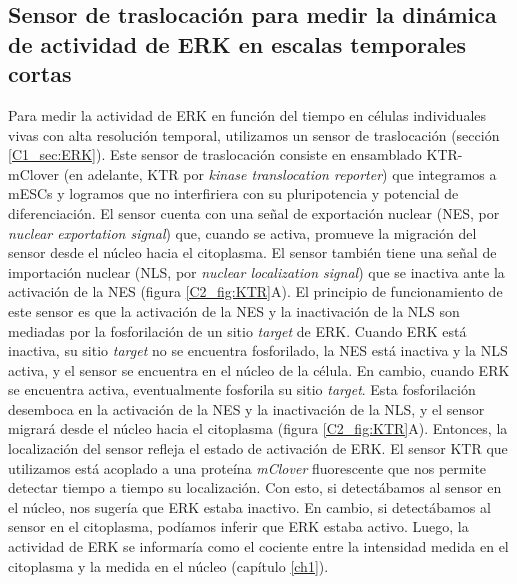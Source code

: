 \documentclass[./main.tex]{subfiles}
\begin{document}
\subsection{Sensor de traslocación para medir la dinámica de actividad de ERK en escalas temporales cortas}
\label{C2_ssec:sensor}

Para medir la actividad de ERK en función del tiempo en células individuales vivas con alta resolución temporal, utilizamos un sensor de traslocación (sección \ref{C1_sec:ERK}).  Este sensor de traslocación consiste en ensamblado KTR-mClover (en adelante, KTR por \textit{kinase translocation reporter}) que integramos a mESCs y logramos que no interfiriera con su pluripotencia y potencial de diferenciación. El sensor cuenta con una señal de exportación nuclear (NES, por \textit{nuclear exportation signal}) que, cuando se activa, promueve la migración del sensor desde el núcleo hacia el citoplasma. El sensor también tiene una señal de importación nuclear (NLS, por \textit{nuclear localization signal}) que se inactiva ante la activación de la NES (figura \ref{C2_fig:KTR}A). El principio de funcionamiento de este sensor es que la activación de la NES y la inactivación de la NLS son mediadas por la fosforilación de un sitio \textit{target} de ERK. Cuando ERK está inactiva, su sitio \textit{target} no se encuentra fosforilado, la NES está inactiva y la NLS activa, y el sensor se encuentra en el núcleo de la célula. En cambio, cuando ERK se encuentra activa, eventualmente fosforila su sitio \textit{target}. Esta fosforilación desemboca en la activación de la NES y la inactivación de la NLS, y el sensor migrará desde el núcleo hacia el citoplasma (figura \ref{C2_fig:KTR}A). Entonces, la localización del sensor refleja el estado de activación de ERK. El sensor KTR que utilizamos está acoplado a una proteína \textit{mClover} fluorescente que nos permite detectar tiempo a tiempo su localización. Con esto, si detectábamos al sensor en el núcleo, nos sugería que ERK estaba inactivo. En cambio, si detectábamos al sensor en el citoplasma, podíamos inferir que ERK estaba activo. Luego, la actividad de ERK se informaría como el cociente entre la intensidad medida en el citoplasma y la medida en el núcleo \cite{Regot2014} (capítulo \ref{ch1}).
\end{document}
